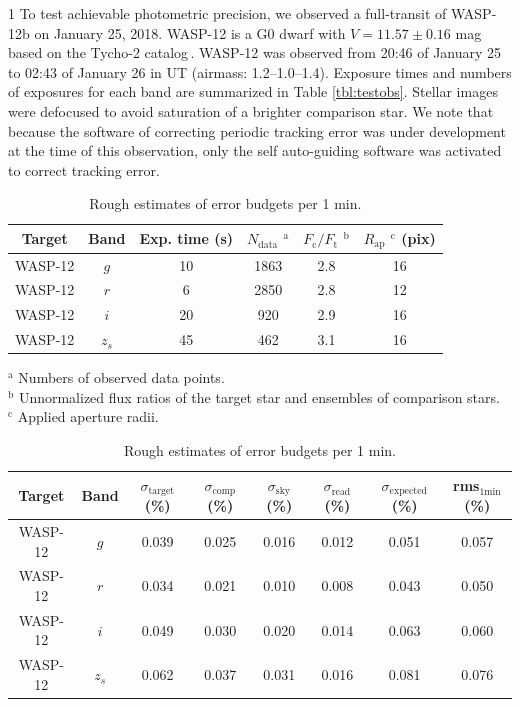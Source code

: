 \documentclass[a4paper,12pt]{spieman}  %
\begin{document}
\begin{spacing}{1}
To test achievable photometric precision, we observed a full-transit of WASP-12b
on January 25, 2018.
WASP-12 is a G0 dwarf with $V=11.57\pm0.16$ mag based on the Tycho-2
catalog\cite{2000A&A...355L..27H}\,\!.
WASP-12 was observed
from 20:46 of January 25 to 02:43 of January 26 in UT
(airmass: 1.2--1.0--1.4). 
Exposure times and numbers of exposures for each band are summarized in Table \ref{tbl:testobs}.
Stellar images were defocused to avoid saturation of a brighter comparison star.
We note that because the software of correcting periodic tracking error was
under development at the time of this observation, only the self auto-guiding software
was activated to correct tracking error.

\begin{table}[t]
\begin{center}
\caption{Summary of the test observation and analysis
\label{tbl:testobs}}
\vspace{5pt}
\small
\begin{tabular}{cccccc}
\hline
\hline
Target & Band & Exp. time (s) & $N_\mathrm{data}$ $^\mathrm{a}$ & $F_\mathrm{c}/F_\mathrm{t}$ $^\mathrm{b}$ & $R_\mathrm{ap}$ $^\mathrm{c}$ (pix)   \\
\hline
WASP-12 &$g$ & 10 & 1863 & 2.8 & 16 \\
WASP-12 &$r$ & 6 & 2850 & 2.8 & 12 \\
WASP-12 &$i$ & 20 & 920 & 2.9 & 16 \\
WASP-12 &$z_{s}$ & 45 & 462 & 3.1 & 16 \\
\hline
\end{tabular}
\end{center}
{\scriptsize
$^\mathrm{a}$ Numbers of observed data points.\\
$^\mathrm{b}$ Unnormalized flux ratios of the target star and ensembles of comparison stars.\\
$^\mathrm{c}$ Applied aperture radii.\\
}
\begin{center}
\small
\caption{Rough estimates of error budgets per 1 min.
\label{tbl:error_budget}}
\vspace{5pt}
\begin{tabular}{cccccccc}
\hline
\hline
Target & Band & $\sigma_\mathrm{target}$ (\%)& $\sigma_\mathrm{comp}$ (\%)& $\sigma_\mathrm{sky}$ (\%)&
$\sigma_\mathrm{read}$ (\%)& $\sigma_\mathrm{expected}$ (\%) & rms$_\mathrm{1min}$ (\%) \\ 
\hline
WASP-12 & $g$       &  0.039 & 0.025 & 0.016 & 0.012 & 0.051 & 0.057\\
WASP-12 & $r$        &  0.034 & 0.021 & 0.010 & 0.008 & 0.043 & 0.050\\
WASP-12 & $i$        &  0.049 & 0.030 & 0.020 & 0.014 & 0.063 & 0.060\\
WASP-12 & $z_{s}$ &  0.062 & 0.037 & 0.031 & 0.016 & 0.081 & 0.076\\
\hline
\end{tabular}
\end{center}
{\footnotesize
}
\end{table}


\end{spacing}
\end{document}
